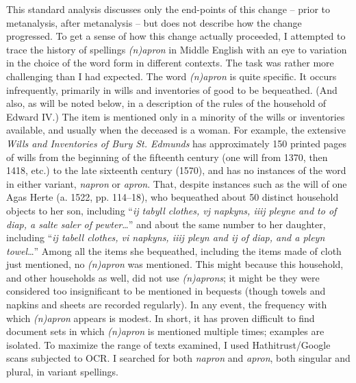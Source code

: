\documentclass[output=paper,
modfonts
]{LSP/langsci}
\begin{document}
This standard analysis discusses only the end-points of this
change -- prior to metanalysis, after metanalysis -- but does not
describe how the change progressed. To get a sense of how this change
actually proceeded, I attempted to trace the history of spellings
\emph{(n)apron} in Middle English with an eye to variation in the choice
of the word form in different contexts. The task was rather more
challenging than I had expected. The word \emph{(n)apron} is quite
specific. It occurs infrequently, primarily in wills and inventories of
good to be bequeathed. (And also, as will be noted below, in a
description of the rules of the household of Edward IV.) The item is
mentioned only in a minority of the wills or inventories available, and
usually when the deceased is a woman. For example, the extensive
\emph{Wills and Inventories of Bury St. Edmunds} has approximately 150
printed pages of wills from the beginning of the fifteenth century (one
will from 1370, then 1418, etc.) to the late sixteenth century (1570),
and has no instances of the word in either variant, \emph{napron} or
\emph{apron}. That, despite instances such as the will of one Agas Herte
(a. 1522, pp. 114--18), who bequeathed about 50 distinct household
objects to her son, including ``\emph{ij tabyll clothes, vj napkyns,
iiij pleyne and to of diap, a salte saler of pewter}\ldots{}'' and about
the same number to her daughter, including ``\emph{ij tabell clothes, vi
napkyns, iiij pleyn and ij of diap, and a pleyn towel}\ldots{}'' Among
all the items she bequeathed, including the items made of cloth just
mentioned, no \emph{(n)apron} was mentioned. This might because this
household, and other households as well, did not use \emph{(n)aprons};
it might be they were considered too insignificant to be mentioned in
bequests (though towels and napkins and sheets are recorded regularly).
In any event, the frequency with which \emph{(n)apron} appears is
modest. In short, it has proven difficult to find document sets in which
\emph{(n)apron} is mentioned multiple times; examples are isolated. To
maximize the range of texts examined, I used Hathitrust/Google scans
subjected to OCR. I searched for both \emph{napron} and \emph{apron},
both singular and plural, in variant spellings.
\end{document}
